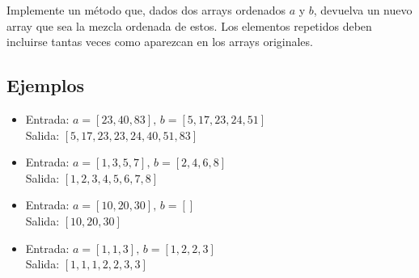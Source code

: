 Implemente un método que, dados dos arrays ordenados \(a\) y \(b\), devuelva un nuevo array que sea la mezcla ordenada de estos. Los elementos repetidos deben incluirse tantas veces como aparezcan en los arrays originales.

\subsection*{Ejemplos}

\begin{itemize}
    \item Entrada: \(a = [23, 40, 83], \, b = [5, 17, 23, 24, 51]\)\\
    Salida: \([5, 17, 23, 23, 24, 40, 51, 83]\)

    \item Entrada: \(a = [1, 3, 5, 7], \, b = [2, 4, 6, 8]\)\\
    Salida: \([1, 2, 3, 4, 5, 6, 7, 8]\)

    \item Entrada: \(a = [10, 20, 30], \, b = []\)\\
    Salida: \([10, 20, 30]\)

    \item Entrada: \(a = [1, 1, 3], \, b = [1, 2, 2, 3]\)\\
    Salida: \([1, 1, 1, 2, 2, 3, 3]\)
\end{itemize}
